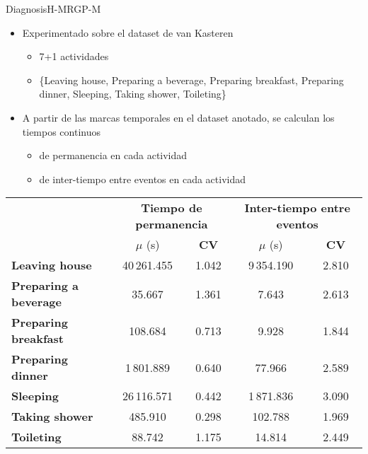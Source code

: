 \documentclass[9pt, handout]{beamer}
\begin{document}
      \begin{frame}{Diagnosis}{H-MRGP-M}
        \begin{itemize}
          \item Experimentado sobre el dataset de van Kasteren
          \begin{itemize}
            \item 7+1 actividades
            \item \{Leaving house, Preparing a beverage, Preparing breakfast, Preparing dinner, Sleeping, Taking shower, Toileting\}
          \end{itemize}
          \item A partir de las marcas temporales en el dataset anotado, se calculan los tiempos continuos
          \begin{itemize}
            \item de permanencia en cada actividad
            \item de inter-tiempo entre eventos en cada actividad
          \end{itemize}
        \end{itemize}
        
    		\begin{table}[h!]
    			\centering
    			\small
    			\setlength{\tabcolsep}{5pt}
    			\def\arraystretch{0.75}
    			\begin{tabular}{| l | c | c || c | c |}
    				\hline
    				& \multicolumn{2}{|c||}{\bf Tiempo de permanencia}& \multicolumn{2}{|c|}{\bf Inter-tiempo entre eventos}\\
    				\cline{2-5}
    				& $\mu$ (s) & {\bf CV} & $\mu$ (s) & {\bf CV}\\
    				\hline
    				{\bf Leaving house} & 40\,261.455 & 1.042 & 9\,354.190 & 2.810 \\ \hline
    				{\bf Preparing a beverage} &  35.667 & 1.361 & 7.643 & 2.613\\ \hline
    				{\bf Preparing breakfast} &  108.684 & 0.713 & 9.928 & 1.844\\ \hline
    				{\bf Preparing dinner} &  1\,801.889 & 0.640 & 77.966 & 2.589\\ \hline
    				{\bf Sleeping} &  26\,116.571 & 0.442 & 1\,871.836 & 3.090\\ \hline
    				{\bf Taking shower} &  485.910 & 0.298 & 102.788 & 1.969\\ \hline
    				{\bf Toileting} &  88.742 & 1.175 & 14.814 & 2.449\\ 
    				\hline
      		\end{tabular}
    		\end{table}
      \end{frame}
      
\end{document}

